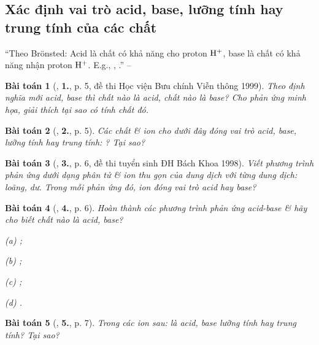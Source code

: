 \documentclass{article}
\numberwithin{equation}{section}
\newtheorem{baitoan}{Bài toán}[section]
\begin{document}
\subsection{Xác định vai trò acid, base, lưỡng tính hay trung tính của các chất}
``Theo Br\"onsted: Acid là chất có khả năng cho proton $\rm H^+$, base là chất có khả năng nhận proton $\rm H^+$. E.g., , .'' -- \cite[p. 8]{An2004}

\begin{baitoan}[\cite{An2004}, \textbf{1.}, p. 5, đề thi Học viện Bưu chính Viễn thông 1999]
	Theo định nghĩa mới acid, base thì \emph{} chất nào là acid, chất nào là base? Cho phản ứng minh họa, giải thích tại sao \emph{} có tính chất đó.
\end{baitoan}

\begin{baitoan}[\cite{An2004}, \textbf{2.}, p. 5]
	Các chất \& ion cho dưới đây đóng vai trò acid, base, lưỡng tính hay trung tính: \emph{}? Tại sao?
\end{baitoan}

\begin{baitoan}[\cite{An2004}, \textbf{3.}, p. 6, đề thi tuyển sinh ĐH Bách Khoa 1998]
	Viết phương trình phản ứng dưới dạng phân tử \& ion thu gọn của dung dịch \emph{} với từng dung dịch: \emph{} loãng, \emph{} dư. Trong mỗi phản ứng đó, ion \emph{} đóng vai trò acid hay base?
\end{baitoan}

\begin{baitoan}[\cite{An2004}, \textbf{4.}, p. 6]
	Hoàn thành các phương trình phản ứng acid-base \& hãy cho biết chất nào là acid, base?
	\begin{enumerate*}
		\item[(a)] \emph{};
		\item[(b)] \emph{};
		\item[(c)] \emph{};
		\item[(d)] \emph{}.
	\end{enumerate*}
\end{baitoan}

\begin{baitoan}[\cite{An2004}, \textbf{5.}, p. 7]
	Trong các ion sau: \emph{} là acid, base lưỡng tính hay trung tính? Tại sao?
\end{baitoan}
\end{document}
